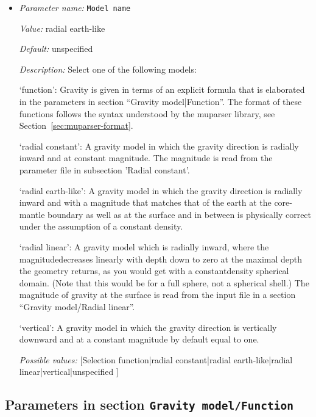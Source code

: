 \begin{itemize}
\item {\it Parameter name:} {\tt Model name}
\label{parameters:Gravity model/Model name}


{\it Value:} radial earth-like


{\it Default:} unspecified


{\it Description:} Select one of the following models:

`function': Gravity is given in terms of an explicit formula that is elaborated in the parameters in section ``Gravity model|Function''. The format of these functions follows the syntax understood by the muparser library, see Section~\ref{sec:muparser-format}.

`radial constant': A gravity model in which the gravity direction is radially inward and at constant magnitude. The magnitude is read from the parameter file in subsection 'Radial constant'.

`radial earth-like': A gravity model in which the gravity direction is radially inward and with a magnitude that matches that of the earth at the core-mantle boundary as well as at the surface and in between is physically correct under the assumption of a constant density.

`radial linear': A gravity model which is radially inward, where the magnitudedecreases linearly with depth down to zero at the maximal depth the geometry returns, as you would get with a constantdensity spherical domain. (Note that this would be for a full sphere, not a spherical shell.) The magnitude of gravity at the surface is read from the input file in a section ``Gravity model/Radial linear''.

`vertical': A gravity model in which the gravity direction is vertically downward and at a constant magnitude by default equal to one.


{\it Possible values:} [Selection function|radial constant|radial earth-like|radial linear|vertical|unspecified ]
\end{itemize}



\subsection{Parameters in section \tt Gravity model/Function}
\label{parameters:Gravity_20model/Function}

